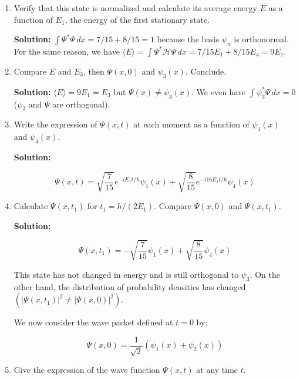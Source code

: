 \documentclass{article}
\begin{document}
    \begin{enumerate}
        \item Verify that this state is normalized and calculate its average energy $E$ as a function of $E_{1}$, the energy of the first stationary state.

        {\color{red}\textbf{Solution:} $\int \Psi^{*} \Psi \, dx = 7/15 + 8/15 = 1$ because the basis $\psi_{n}$ is orthonormal. For the same reason, we have $\langle E \rangle = \int \Psi^{*} \mathcal{H} \Psi \, dx = 7/15 E_{1} + 8/15 E_{4} = 9 E_{1}$.}

        \item Compare $E$ and $E_{3}$, then $\Psi(x, 0)$ and $\psi_{3}(x)$. Conclude.

        {\color{red}\textbf{Solution:} $\langle E \rangle = 9 E_{1} = E_{3}$ but $\Psi(x) \neq \psi_{3}(x)$. We even have $\int \psi_{3}^{*} \Psi \, dx = 0$ ($\psi_{3}$ and $\Psi$ are orthogonal).}

        \item Write the expression of $\Psi(x, t)$ at each moment as a function of $\psi_{1}(x)$ and $\psi_{4}(x)$.

        {\color{red}\textbf{Solution:}

        $$
        \Psi(x, t) = \sqrt{\frac{7}{15}} e^{-i E_{1} t / \hbar} \psi_{1}(x) + \sqrt{\frac{8}{15}} e^{-i 16 E_{1} t / \hbar} \psi_{4}(x)
        $$}

        \item Calculate $\Psi\left(x, t_{1}\right)$ for $t_{1} = h / \left(2 E_{1}\right)$. Compare $\Psi(x, 0)$ and $\Psi\left(x, t_{1}\right)$.

        {\color{red}\textbf{Solution:}

        $$
        \Psi\left(x, t_{1}\right) = -\sqrt{\frac{7}{15}} \psi_{1}(x) + \sqrt{\frac{8}{15}} \psi_{4}(x)
        $$

        This state has not changed in energy and is still orthogonal to $\psi_{3}$. On the other hand, the distribution of probability densities has changed $\left(\left|\Psi\left(x, t_{1}\right)\right|^{2} \neq |\Psi(x, 0)|^{2}\right)$.

        We now consider the wave packet defined at $t=0$ by:

        $$
        \Psi(x, 0) = \frac{1}{\sqrt{2}} \left(\psi_{1}(x) + \psi_{2}(x)\right)
        $$}

        \item Give the expression of the wave function $\Psi(x, t)$ at any time $t$.


\end{enumerate}
\end{document}
